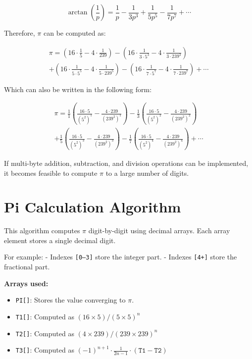 \begin{equation}
\arctan\left(\frac{1}{p}\right) = \frac{1}{p} - \frac{1}{3p^3} + \frac{1}{5p^5} - \frac{1}{7p^7} + \cdots
\end{equation}



Therefore, $\pi$ can be computed as:

\begin{multline}
\pi = \left(16 \cdot \frac{1}{5} - 4 \cdot \frac{1}{239}\right)
    - \left(16 \cdot \frac{1}{3 \cdot 5^3} - 4 \cdot \frac{1}{3 \cdot 239^3}\right)\\
    + \left(16 \cdot \frac{1}{5 \cdot 5^5} - 4 \cdot \frac{1}{5 \cdot 239^5}\right)
    - \left(16 \cdot \frac{1}{7 \cdot 5^7} - 4 \cdot \frac{1}{7 \cdot 239^7}\right)
    + \cdots
\end{multline}



Which can also be written in the following form:


\begin{multline}
\pi = \frac{1}{1}\left(\frac{16 \cdot 5}{(5^2)^1} - \frac{4 \cdot 239}{(239^2)^1}\right)
    - \frac{1}{3}\left(\frac{16 \cdot 5}{(5^2)^2} - \frac{4 \cdot 239}{(239^2)^2}\right)\\
    + \frac{1}{5}\left(\frac{16 \cdot 5}{(5^2)^3} - \frac{4 \cdot 239}{(239^2)^3}\right)
    - \frac{1}{7}\left(\frac{16 \cdot 5}{(5^2)^4} - \frac{4 \cdot 239}{(239^2)^4}\right)
    + \cdots
\end{multline}

If multi-byte addition, subtraction, and division operations can be implemented, it becomes feasible to compute $\pi$ to a large number of digits.

\section{Pi Calculation Algorithm}
This algorithm computes $\pi$ digit-by-digit using decimal arrays. Each array element stores a single decimal digit.

For example:
- Indexes \texttt{[0--3]} store the integer part.
- Indexes \texttt{[4+]} store the fractional part.

\vspace{1em}
\noindent \textbf{Arrays used:}
\begin{itemize}
  \item \texttt{PI[]}: Stores the value converging to $\pi$.
  \item \texttt{T1[]}: Computed as $(16 \times 5)/(5 \times 5)^n$
  \item \texttt{T2[]}: Computed as $(4 \times 239)/(239 \times 239)^n$
  \item \texttt{T3[]}: Computed as $(-1)^{n+1} \cdot \frac{1}{2n - 1} \cdot (\texttt{T1} - \texttt{T2})$
\end{itemize}

